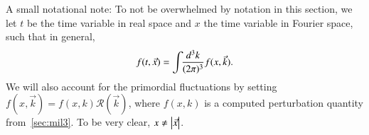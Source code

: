 







A small notational note: To not be overwhelmed by notation in this section, we let $t$ be the time variable in real space and $x$ the time variable in Fourier space, such that in general,
\begin{equation}
    f(t, \vec{x}) = \int \!\! \frac{d^3 {k}}{(2\pi)^3} f(x, \vec{k}).
\end{equation}
We will also account for the primordial fluctuations by setting $f(x,\vec{k})= f(x, k) \mathcal{R}(\vec{k})$, where $f(x,k)$ is a computed perturbation quantity from~\cref{sec:mil3}. To be very clear, $x\neq \abs{\vec{x}}$.













